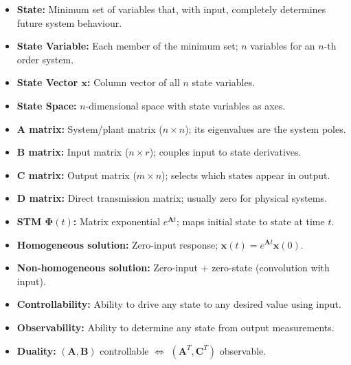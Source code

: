 \documentclass[12pt,a4paper]{article}
\begin{document}
\vspace{5pt}

\begin{tcolorbox}[defbox, title={\textbf{One-Line Definitions}}]
\begin{itemize}[leftmargin=*, itemsep=3pt, topsep=0pt]
  \item \textbf{State:} Minimum set of variables that, with input, completely determines future system behaviour.
  \item \textbf{State Variable:} Each member of the minimum set; $n$ variables for an $n$-th order system.
  \item \textbf{State Vector $\mathbf{x}$:} Column vector of all $n$ state variables.
  \item \textbf{State Space:} $n$-dimensional space with state variables as axes.
  \item \textbf{$\mathbf{A}$ matrix:} System/plant matrix ($n\times n$); its eigenvalues are the system poles.
  \item \textbf{$\mathbf{B}$ matrix:} Input matrix ($n\times r$); couples input to state derivatives.
  \item \textbf{$\mathbf{C}$ matrix:} Output matrix ($m\times n$); selects which states appear in output.
  \item \textbf{$\mathbf{D}$ matrix:} Direct transmission matrix; usually zero for physical systems.
  \item \textbf{STM $\boldsymbol{\Phi}(t)$:} Matrix exponential $e^{\mathbf{A}t}$; maps initial state to state at time $t$.
  \item \textbf{Homogeneous solution:} Zero-input response; $\mathbf{x}(t) = e^{\mathbf{A}t}\mathbf{x}(0)$.
  \item \textbf{Non-homogeneous solution:} Zero-input + zero-state (convolution with input).
  \item \textbf{Controllability:} Ability to drive any state to any desired value using input.
  \item \textbf{Observability:} Ability to determine any state from output measurements.
  \item \textbf{Duality:} $(\mathbf{A},\mathbf{B})$ controllable $\Leftrightarrow$ $(\mathbf{A}^T,\mathbf{C}^T)$ observable.
\end{itemize}
\end{tcolorbox}

\vspace{5pt}
\end{document}
